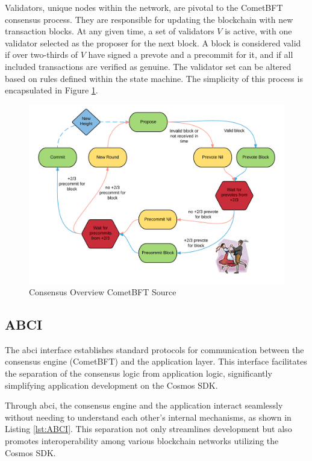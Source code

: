 Validators, unique nodes within the network, are pivotal to the CometBFT consensus process. They are responsible for updating the blockchain with new transaction blocks. At any given time, a set of validators \(V\) is active, with one validator selected as the proposer for the next block. A block is considered valid if over two-thirds of \(V\) have signed a prevote and a precommit for it, and if all included transactions are verified as genuine. The validator set can be altered based on rules defined within the state machine. The simplicity of this process is encapsulated in Figure \ref{fig:cometbft-overview}.

\begin{figure}[H]
    \centering
    \includegraphics[width=\textwidth]{figures/cometbft.png}
    \caption{Consensus Overview CometBFT Source\cite{cometbft-overview}}
    \label{fig:cometbft-overview}
\end{figure}

\subsection{ABCI}

The \gls{abci} interface establishes standard protocols for communication between the consensus engine (CometBFT) and the application layer. This interface facilitates the separation of the consensus logic from application logic, significantly simplifying application development on the Cosmos SDK.

Through \gls{abci}, the consensus engine and the application interact seamlessly without needing to understand each other's internal mechanisms, as shown in Listing \ref{lst:ABCI}. This separation not only streamlines development but also promotes interoperability among various blockchain networks utilizing the Cosmos SDK.

